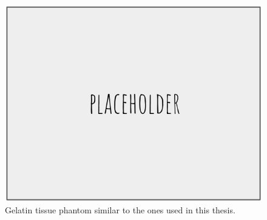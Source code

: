 \begin{figure}[h]
\includegraphics[width=1.0\textwidth]{Fig/placeholder.png}
\caption{Gelatin tissue phantom similar to the ones used in this thesis.}
\label{fig:gelatin_phantom}
\end{figure}





